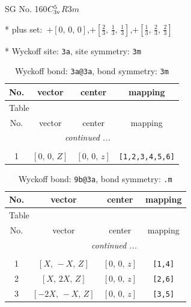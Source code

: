 \documentclass[fleqn,8pt]{jsarticle}
\begin{document}
\setcounter{MaxMatrixCols}{32}

\renewcommand{\tablename}{Table~}
\renewcommand{\figurename}{Figure~}
\begin{center}
\LARGE
SG No. 160\quad$C_{\rm 3v}^{5}$\quad$R3m$\quad[ trigonal ]
\end{center}

* plus set:\,\,\,$+\left[ 0,\, 0,\, 0 \right]$,\quad $+\left[ \frac{2}{3},\, \frac{1}{3},\, \frac{1}{3} \right]$,\quad $+\left[ \frac{1}{3},\, \frac{2}{3},\, \frac{2}{3} \right]$


* Wyckoff site: {\tt 3a}, site symmetry: {\tt 3m}
\renewcommand{\arraystretch}{1.2}
\begin{longtable}{cccc}
\caption{Wyckoff bond: {\tt 3a@3a}, bond symmetry: {\tt 3m}}
 \\
 \hline \hline
No. & vector & center & mapping \\ \hline \endfirsthead

\multicolumn{3}{l}{\tablename\ \thetable{}} \\
 \hline \hline
No. & vector & center & mapping \\ \hline \endhead

 \hline \hline
\multicolumn{3}{r}{\footnotesize\it continued ...} \\ \endfoot

 \hline \hline
\multicolumn{3}{r}{} \\ \endlastfoot

1 & $\left[ 0,\, 0,\, Z \right]$ & $\left[ 0,\, 0,\, z \right]$ & {\tt [1,2,3,4,5,6]} \\
\end{longtable}
\renewcommand{\arraystretch}{1.2}
\begin{longtable}{cccc}
\caption{Wyckoff bond: {\tt 9b@3a}, bond symmetry: {\tt .m}}
 \\
 \hline \hline
No. & vector & center & mapping \\ \hline \endfirsthead

\multicolumn{3}{l}{\tablename\ \thetable{}} \\
 \hline \hline
No. & vector & center & mapping \\ \hline \endhead

 \hline \hline
\multicolumn{3}{r}{\footnotesize\it continued ...} \\ \endfoot

 \hline \hline
\multicolumn{3}{r}{} \\ \endlastfoot

1 & $\left[ X,\, - X,\, Z \right]$ & $\left[ 0,\, 0,\, z \right]$ & {\tt [1,4]} \\ \hline
2 & $\left[ X,\, 2 X,\, Z \right]$ & $\left[ 0,\, 0,\, z \right]$ & {\tt [2,6]} \\ \hline
3 & $\left[ - 2 X,\, - X,\, Z \right]$ & $\left[ 0,\, 0,\, z \right]$ & {\tt [3,5]} \\
\end{longtable}
\end{document}
